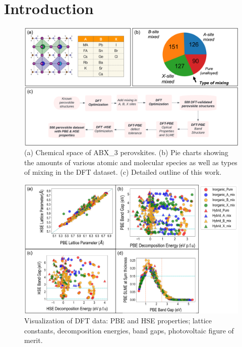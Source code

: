 \documentclass[twoside,twocolumn,9pt]{article}
\begin{document}

    \section*{Introduction}

    \begin{figure}[h]
      \centering
      \includegraphics[width=0.99\linewidth]{Figure1.png}
      \caption{\label{Fig:outline} 
        (a) Chemical space of ABX_3 perovskites. (b) Pie charts showing
        the amounts of various atomic and molecular species as well as types
        of mixing in the DFT dataset. (c) Detailed outline of this work.
      }
    \end{figure}


    \begin{figure}[h]
      \centering
      \includegraphics[width=0.99\linewidth]{Figure2.png}
      \caption{\label{Fig:outline} 
        Visualization of DFT data: PBE and HSE properties; lattice constants,
        decomposition energies, band gaps, photovoltaic figure of merit.
      }
    \end{figure}
\end{document}
